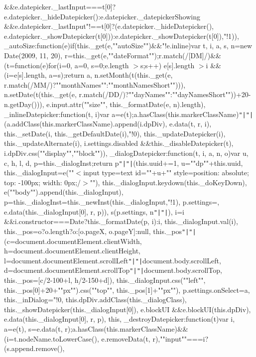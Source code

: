 \&\&e.\+datepicker.\+\_\+last\+Input===t[0]?e.\+datepicker.\+\_\+hide\+Datepicker()\+:e.\+datepicker.\+\_\+datepicker\+Showing \&\&e.\+datepicker.\+\_\+last\+Input"!==t[0]?(e.\+datepicker.\+\_\+hide\+Datepicker(), e.\+datepicker.\+\_\+show\+Datepicker(t[0]))\+:e.\+datepicker.\+\_\+show\+Datepicker(t[0]),"!1\rcurly{}))\rcurly{}, \+\_\+auto\+Size\+:function(e)\lcurly{}if(this.\+\_\+get(e,""auto\+Size"")\&\&"!e.\+inline)\lcurly{}var t, i, a, s, n=new Date(2009, 11, 20), r=this.\+\_\+get(e,""date\+Format"");r.\+match(/[DM]/)\&\&(t=function(e)\lcurly{}for(i=0, a=0, s=0;e.\+length $>$s;s++) e[s].\+length $>$i \&\&(i=e[s].\+length, a=s);return a\rcurly{}, n.\+set\+Month(t(this.\+\_\+get(e, r.\+match(/\+M\+M/)?""month\+Names""\+:""month\+Names\+Short""))), n.\+set\+Date(t(this.\+\_\+get(e, r.\+match(/\+D\+D/)?""day\+Names""\+:""day\+Names\+Short""))+20-\/n.\+get\+Day())), e.\+input.\+attr(""size"", this.\+\_\+format\+Date(e, n).\+length)\rcurly{}\rcurly{}, \+\_\+inline\+Datepicker\+:function(t, i)\lcurly{}var a=e(t);a.\+has\+Class(this.\+marker\+Class\+Name)\texttt{"|}\texttt{"|}(a.\+add\+Class(this.\+marker\+Class\+Name).\+append(i.\+dp\+Div), e.\+data(t, r, i), this.\+\_\+set\+Date(i, this.\+\_\+get\+Default\+Date(i),"!0), this.\+\_\+update\+Datepicker(i), this.\+\_\+update\+Alternate(i), i.\+settings.\+disabled \&\&this.\+\_\+disable\+Datepicker(t), i.\+dp\+Div.\+css(""display"",""block""))\rcurly{}, \+\_\+dialog\+Datepicker\+:function(t, i, a, n, o)\lcurly{}var u, c, h, l, d, p=this.\+\_\+dialog\+Inst;return p\texttt{"|}\texttt{"|}(this.\+uuid+=1, u=""dp""+this.\+uuid, this.\+\_\+dialog\+Input=e(""$<$input type=\textquotesingle{}text\textquotesingle{} id=\textquotesingle{}""+u+""\textquotesingle{} style=\textquotesingle{}position\+: absolute; top\+: -\/100px; width\+: 0px;\textquotesingle{}/$>$""), this.\+\_\+dialog\+Input.\+keydown(this.\+\_\+do\+Key\+Down), e(""body"").\+append(this.\+\_\+dialog\+Input), p=this.\+\_\+dialog\+Inst=this.\+\_\+new\+Inst(this.\+\_\+dialog\+Input,"!1), p.\+settings=\lcurly{}\rcurly{}, e.\+data(this.\+\_\+dialog\+Input[0], r, p)), s(p.\+settings, n\texttt{"|}\texttt{"|}\lcurly{}\rcurly{}), i=i \&\&i.\+constructor===\+Date?this.\+\_\+format\+Date(p, i)\+:i, this.\+\_\+dialog\+Input.\+val(i), this.\+\_\+pos=o?o.\+length?o\+:[o.\+page\+X, o.\+pageY]\+:null, this.\+\_\+pos\texttt{"|}\texttt{"|}(c=document.\+document\+Element.\+client\+Width, h=document.\+document\+Element.\+client\+Height, l=document.\+document\+Element.\+scroll\+Left\texttt{"|}\texttt{"|}document.\+body.\+scroll\+Left, d=document.\+document\+Element.\+scroll\+Top\texttt{"|}\texttt{"|}document.\+body.\+scroll\+Top, this.\+\_\+pos=[c/2-\/100+l, h/2-\/150+d]), this.\+\_\+dialog\+Input.\+css(""left"", this.\+\_\+pos[0]+20+""px"").\+css(""top"", this.\+\_\+pos[1]+""px""), p.\+settings.\+on\+Select=a, this.\+\_\+in\+Dialog="!0, this.\+dp\+Div.\+add\+Class(this.\+\_\+dialog\+Class), this.\+\_\+show\+Datepicker(this.\+\_\+dialog\+Input[0]), e.\+block\+U\+I \&\&e.\+block\+U\+I(this.\+dp\+Div), e.\+data(this.\+\_\+dialog\+Input[0], r, p), this\rcurly{}, \+\_\+destroy\+Datepicker\+:function(t)\lcurly{}var i, a=e(t), s=e.\+data(t, r);a.\+has\+Class(this.\+marker\+Class\+Name)\&\&(i=t.\+node\+Name.\+to\+Lower\+Case(), e.\+remove\+Data(t, r),""input""===i?(s.\+append.\+remove(), 